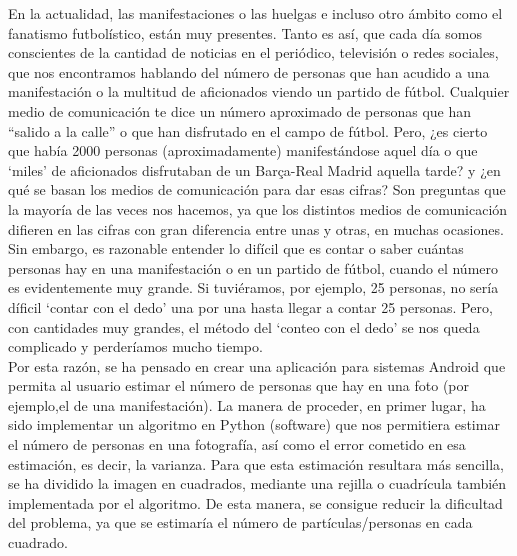 \documentclass[PFC.tex]{subfiles}
\begin{document}
En la actualidad, las manifestaciones o las huelgas e incluso otro ámbito como el fanatismo futbolístico, están muy presentes. Tanto es así, que cada día somos conscientes de la cantidad de noticias en el periódico, televisión o redes sociales, que nos encontramos hablando del número de personas que han acudido a una manifestación o la multitud de aficionados viendo un partido de fútbol. Cualquier medio de comunicación te dice un número aproximado de personas que han “salido a la calle” o que han disfrutado en el campo de fútbol. Pero, ¿es cierto que había 2000 personas (aproximadamente) manifestándose aquel día o que ‘miles’ de aficionados disfrutaban de un Barça-Real Madrid aquella tarde? y ¿en qué se basan los medios de comunicación para dar esas cifras? Son preguntas que la mayoría de las veces nos hacemos, ya que los distintos medios de comunicación difieren en las cifras con gran diferencia entre unas y otras, en muchas ocasiones.\\

Sin embargo, es razonable entender lo difícil que es contar o saber cuántas personas hay en una manifestación o en un partido de fútbol, cuando el número es evidentemente muy grande. Si tuviéramos, por ejemplo, 25 personas, no sería díficil ‘contar con el dedo’ una por una hasta llegar a contar 25 personas. Pero, con cantidades muy grandes, el método del ‘conteo con el dedo’ se nos queda complicado y perderíamos mucho tiempo.\\

Por esta razón, se ha pensado en crear una aplicación para sistemas Android que permita al usuario estimar el número de personas que hay en una foto (por ejemplo,el de una manifestación). La manera de proceder, en primer lugar, ha sido implementar un algoritmo en Python (software) que nos permitiera estimar el número de personas en una fotografía, así como el error cometido en esa estimación, es decir, la varianza. Para que esta estimación resultara más sencilla, se ha dividido la imagen en cuadrados, mediante una rejilla o cuadrícula también implementada por el algoritmo. De esta manera, se consigue reducir la dificultad del problema, ya que se estimaría el número de partículas/personas en cada cuadrado.
\end{document}
